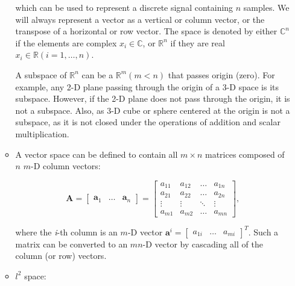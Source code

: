 \documentclass[10pt,b5paper,titlepage]{book}
\begin{document}
\begin{itemize}
\begin{itemize}
                which can be used to represent a discrete signal containing
                $n$ samples. We will always represent a vector as a vertical
                or column vector, or the transpose of a horizontal or row
                vector. The space is denoted by either $\mathbb{C}^{n}$ if the elements
                are complex $x_{i} \in \mathbb{C}$, or $\mathbb{R}^{n}$ if they
                are real $x_{i} \in \mathbb{R} (i = 1, \ldots, n)$.

                A subspace of $\mathbb{R}^{n}$ can be a $\mathbb{R}^{m} (m < n)$
                that passes origin (zero). For example, any 2-D plane passing
                through the origin of a 3-D space is its subspace. However, if
                the 2-D plane does not pass through the origin, it is not a subspace.
                Also, as 3-D cube or sphere centered at the origin is not a subspace,
                as it is not closed under the operations of addition and scalar
                multiplication.

            \item A vector space can be defined to contain all $m \times n$ matrices
                composed of $n$ $m$-D column vectors:

                \begin{equation}
                    \mathbf{A} = \begin{bmatrix} \mathbf{a}_1 & \ldots & \mathbf{a}_n \end{bmatrix}
                    = \begin{bmatrix}
                        a_{11} & a_{12} & \ldots & a_{1n}\\
                        a_{21} & a_{22} & \ldots & a_{2n}\\
                        \vdots & \vdots & \ddots & \vdots\\
                        a_{m1} & a_{m2} & \ldots & a_{mn}
                    \end{bmatrix}
                ,\end{equation}

                where the \textit{i}-th column is an  $m$-D vector
                $\mathbf{a}^{i} = \begin{bmatrix} a_{1i} & \ldots & a_{mi} \end{bmatrix}^{T}$.
                Such a matrix can be converted to an $mn$-D vector by cascading all of the column
                (or row) vectors.

            \item  $l^{2}$ space:\\


\end{itemize}
\end{itemize}
\end{document}
